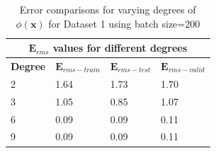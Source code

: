 {
\begin{table}[!ht]
\begin{tabular}{ |p{1.5cm}|p{3cm}|p{3cm}| p{3cm}|  }
\hline
\multicolumn{4}{|c|}{$\mathbf{E}_{rms}$ values for different degrees } \\
\hline
\rowcolor{lightgray} \textbf{Degree} & $\mathbf{E}_{rms-train}$ & $\mathbf{E}_{rms-test}$ & $\mathbf{E}_{rms-valid}$ \\
2   &   1.64  &  1.73   &  1.70   \\   
\hline
 3   &  1.05 &  0.85  &  1.07   \\   
 \hline
 6   &   0.09   &   0.09   &   0.11         \\
 \hline
 9   &  0.09   &    0.09        &     0.11     \\
 \hline
\end{tabular}
\caption{Error comparisons for varying degrees of $\phi(\mathbf{x}) $ for Dataset 1 using batch size=200}
\label{table:3}
\end{table}
}